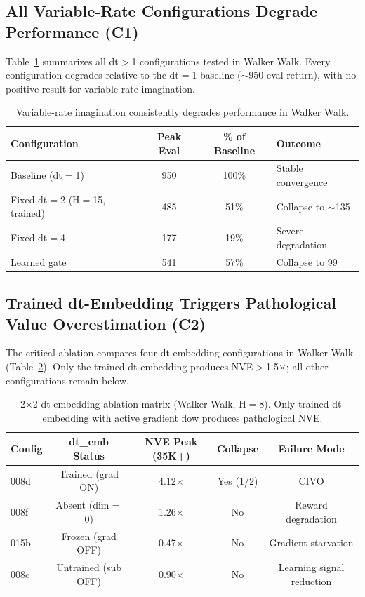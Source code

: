 \documentclass[10pt,letterpaper]{article}
\begin{document}
\subsection{All Variable-Rate Configurations Degrade Performance (C1)}

Table~\ref{tab:c1} summarizes all dt$>$1 configurations tested in Walker Walk.
Every configuration degrades relative to the dt$=$1 baseline ($\sim$950 eval return), with no positive result for variable-rate imagination.

\begin{table}[h]
\centering
\caption{Variable-rate imagination consistently degrades performance in Walker Walk.}
\label{tab:c1}
\begin{tabular}{lccl}
\toprule
\textbf{Configuration} & \textbf{Peak Eval} & \textbf{\% of Baseline} & \textbf{Outcome} \\
\midrule
Baseline (dt$=$1) & 950 & 100\% & Stable convergence \\
Fixed dt$=$2 (H$=$15, trained) & 485 & 51\% & Collapse to $\sim$135 \\
Fixed dt$=$4 & 177 & 19\% & Severe degradation \\
Learned gate & 541 & 57\% & Collapse to 99 \\
\bottomrule
\end{tabular}
\end{table}

\subsection{Trained dt-Embedding Triggers Pathological Value Overestimation (C2)}
\label{sec:c2}

The critical ablation compares four dt-embedding configurations in Walker Walk (Table~\ref{tab:ablation}).
Only the trained dt-embedding produces NVE$>$1.5$\times$; all other configurations remain below.

\begin{table}[h]
\centering
\caption{2$\times$2 dt-embedding ablation matrix (Walker Walk, H$=$8). Only trained dt-embedding with active gradient flow produces pathological NVE.}
\label{tab:ablation}
\begin{tabular}{lcccc}
\toprule
\textbf{Config} & \textbf{dt\_emb Status} & \textbf{NVE Peak (35K+)} & \textbf{Collapse} & \textbf{Failure Mode} \\
\midrule
008d & Trained (grad ON) & 4.12$\times$ & Yes (1/2) & CIVO \\
008f & Absent (dim$=$0) & 1.26$\times$ & No & Reward degradation \\
015b & Frozen (grad OFF) & 0.47$\times$ & No & Gradient starvation \\
008c & Untrained (sub OFF) & 0.90$\times$ & No & Learning signal reduction \\
\bottomrule
\end{tabular}
\end{table}
\end{document}
